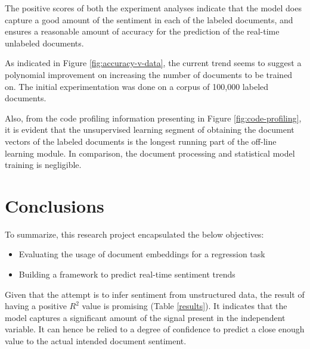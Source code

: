 \documentclass[conference]{IEEEtran}
\begin{document}
        \begin{table}[ht] \caption{Evaluation results} \label{results}
            \centering
        \end{table}

        The positive scores of both the experiment analyses indicate that the model does capture a good amount of the sentiment in each of the labeled documents, and ensures a reasonable amount of accuracy for the prediction of the real-time unlabeled documents.

        As indicated in Figure \ref{fig:accuracy-v-data}, the current trend seems to suggest a polynomial improvement on increasing the number of documents to be trained on. 
        The initial experimentation was done on a corpus of 100,000 labeled documents. 

        Also, from the code profiling information presenting in Figure \ref{fig:code-profiling}, it is evident that the unsupervised learning segment of obtaining the document vectors of the labeled documents is the longest running part of the off-line learning module. In comparison, the document processing and statistical model training is negligible.

\vspace{5mm}

\section{Conclusions}
    To summarize, this research project encapsulated the below objectives:
    \begin{itemize}
        \item Evaluating the usage of document embeddings for a regression task
        \item Building a framework to predict real-time sentiment trends
    \end{itemize}

    Given that the attempt is to infer sentiment from unstructured data, the result of having a positive $R^2$ value is promising (Table \ref{results}).
    It indicates that the model captures a significant amount of the signal present in the independent variable.
    It can hence be relied to a degree of confidence to predict a close enough value to the actual intended document sentiment.
\end{document}

